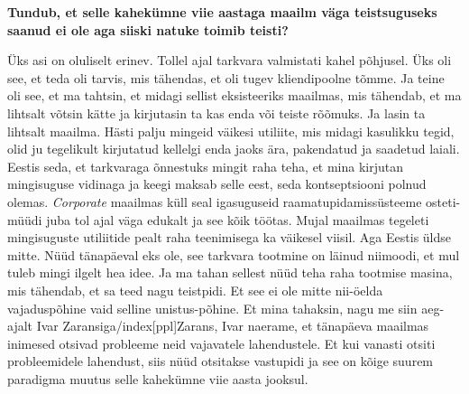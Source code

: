 \textbf{Tundub, et selle kahekümne viie aastaga maailm väga teistsuguseks 
saanud ei ole aga siiski natuke toimib teisti?}

Üks asi on oluliselt erinev. Tollel ajal tarkvara valmistati kahel põhjusel. 
Üks oli see, et teda oli tarvis, mis tähendas, et  oli tugev kliendipoolne 
tõmme. Ja teine oli see, et ma tahtsin, et midagi sellist eksisteeriks 
maailmas, mis tähendab, et ma lihtsalt võtsin kätte ja kirjutasin ta kas enda 
või teiste rõõmuks. Ja lasin ta lihtsalt maailma. Hästi palju mingeid väikesi 
utiliite, mis midagi kasulikku tegid, olid ju tegelikult kirjutatud kellelgi 
enda jaoks ära, pakendatud ja saadetud laiali. Eestis seda, et tarkvaraga 
õnnestuks mingit raha teha, et mina kirjutan mingisuguse vidinaga ja keegi 
maksab selle eest, seda kontseptsiooni polnud olemas. \emph{Corporate} maailmas 
küll seal igasuguseid  raamatupidamissüsteeme osteti-müüdi juba tol ajal väga 
edukalt ja see kõik töötas. Mujal maailmas tegeleti mingisuguste utiliitide 
pealt raha teenimisega ka väikesel viisil. Aga Eestis üldse mitte. Nüüd 
tänapäeval eks ole, see tarkvara tootmine on läinud niimoodi, et mul tuleb mingi 
ilgelt hea idee. Ja ma tahan sellest nüüd teha raha tootmise masina, mis 
tähendab, et sa teed nagu teistpidi. Et see ei ole mitte nii-öelda 
vajaduspõhine vaid selline unistus-põhine. Et mina tahaksin, nagu me siin 
aeg-ajalt  Ivar Zaransiga/index[ppl]{Zarans, Ivar} naerame, et tänapäeva 
maailmas  inimesed  otsivad probleeme neid vajavatele lahendustele. Et kui 
vanasti otsiti probleemidele lahendust, siis nüüd otsitakse vastupidi ja see on 
 kõige suurem paradigma muutus selle kahekümne viie aasta jooksul.
